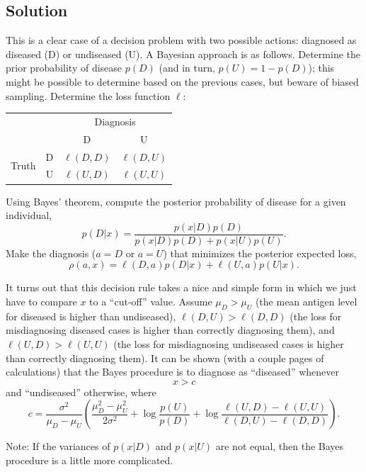 \documentclass[12pt]{article}
\begin{document}
\vspace{1em}

\newpage
\subsection*{Solution}
This is a clear case of a decision problem with two possible actions: diagnosed as diseased (D) or undiseased (U). 
A Bayesian approach is as follows. Determine the prior probability of disease $p(D)$ (and in turn, $p(U) = 1-p(D)$); this might be possible to determine based on the previous cases, but beware of biased sampling. 
Determine the loss function $\ell$:
\begin{center}
\begin{tabular}{l r|c|c|}
\multicolumn{2}{r}{} & \multicolumn{2}{c}{Diagnosis} \\
\multicolumn{2}{r}{}
 &  \multicolumn{1}{c}{D}
 & \multicolumn{1}{c}{U} \\
\cline{3-4}
\multirow{2}{*}{Truth} 
   & D & $\ell(D,D)$ & $\ell(D,U)$ \\
   \cline{3-4}
   & U & $\ell(U,D)$ & $\ell(U,U)$ \\
   \cline{3-4}
\end{tabular}
\end{center}
Using Bayes' theorem, compute the posterior probability of disease for a given individual,
$$ p(D|x) =\frac{p(x|D) p(D)}{p(x|D) p(D) + p(x|U) p(U)}. $$
Make the diagnosis ($a=D$ or $a=U$) that minimizes the posterior expected loss,
$$ \rho(a,x) = \ell(D,a) p(D|x) + \ell(U,a) p(U|x). $$ 

It turns out that this decision rule takes a nice and simple form in which we just have to compare $x$ to a ``cut-off'' value. Assume $\mu_D>\mu_U$ (the mean antigen level for diseased is higher than undiseased), $\ell(D,U)>\ell(D,D)$ (the loss for misdiagnosing diseased cases is higher than correctly diagnosing them), and $\ell(U,D)>\ell(U,U)$ (the loss for misdiagnosing undiseased cases is higher than correctly diagnosing them).  It can be shown (with a couple pages of calculations) that the Bayes procedure is to diagnose as ``diseased'' whenever 
$$ x > c $$
and ``undiseased'' otherwise, where
$$c = \frac{\sigma^2}{\mu_D-\mu_U}\left(\frac{\mu_D^2-\mu_U^2}{2\sigma^2} +\log\frac{p(U)}{p(D)}
+\log\frac{\ell(U,D)-\ell(U,U)}{\ell(D,U)-\ell(D,D)}\right). $$

Note: If the variances of $p(x|D)$ and $p(x|U)$ are not equal, then the Bayes procedure is a little more complicated.
\end{document}
